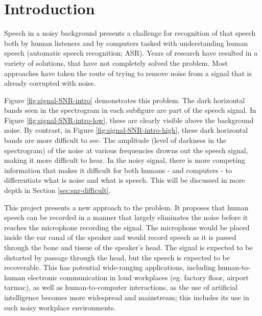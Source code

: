 % 
% 
% 

\chapter{Introduction\label{chapter1}}

Speech in a noisy background presents a challenge for recognition of that speech both by human listeners and by computers tasked with understanding human speech (automatic speech recognition; ASR).  Years of research have resulted in a variety of solutions, that have not completely solved the problem.  Most approaches have taken the route of trying to remove noise from a signal that is already corrupted with noise.

Figure \ref{fig:signal-SNR-intro} demonstrates this problem.  The dark horizontal bands seen in the spectrogram in each subfigure are part of the speech signal.  In Figure \ref{fig:signal-SNR-intro-low}, these are clearly visible above the background noise.  By contrast, in Figure \ref{fig:signal-SNR-intro-high}, these dark horizontal bands are more difficult to see.  The amplitude (level of darkness in the spectrogram) of the noise at various frequencies drowns out the speech signal, making it more difficult to hear.  In the noisy signal, there is more competing information that makes it difficult for both humans - and computers - to differentiate what is noise and what is speech.  This will be discussed in more depth in Section \ref{sec:snr-difficult}.

This project presents a new approach to the problem.  It proposes that human speech can be recorded in a manner that largely eliminates the noise before it reaches the microphone recording the signal.  The microphone would be placed inside the ear canal of the speaker and would record speech as it is passed through the bone and tissue of the speaker's head.  The signal is expected to be distorted by passage through the head, but the speech is expected to be recoverable.  This has potential wide-ranging applications, including human-to-human electronic communication in loud workplaces (eg. factory floor, airport tarmac), as well as human-to-computer interactions, as the use of artificial intelligence becomes more widespread and mainstream; this includes its use in such noisy workplace environments.

